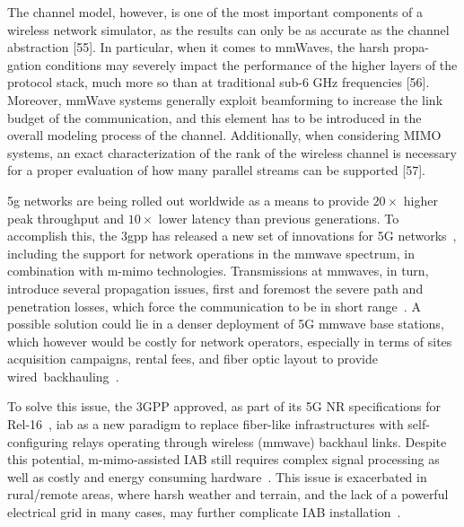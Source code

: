 The channel model, however, is one of the most important components of a
wireless network simulator, as the results can only be as accurate as the channel
abstraction [55]. In particular, when it comes to mmWaves, the harsh propa-
gation conditions may severely impact the performance of the higher layers of
the protocol stack, much more so than at traditional sub-6 GHz frequencies [56].
Moreover, mmWave systems generally exploit beamforming to increase the link
budget of the communication, and this element has to be introduced in the overall
modeling process of the channel. Additionally, when considering MIMO systems,
an exact characterization of the rank of the wireless channel is necessary for a
proper evaluation of how many parallel streams can be supported [57].



\Gls{5g} networks are being rolled out worldwide 
as a means to provide $20\times$ higher peak throughput and $10\times$ lower latency than previous generations.
To accomplish this, the \gls{3gpp} has released a new set of innovations for 5G networks~\cite{38300}, including the support for network operations in the \gls{mmwave} spectrum, in combination with \gls{m-mimo} technologies.
Transmissions at \glspl{mmwave}, in turn, introduce several propagation issues, first and foremost the severe path and penetration losses, which force the communication to be in short range~\cite{rangan2017potentials}.
A possible solution could lie in a denser deployment of 5G \gls{mmwave} base stations, which however would be costly for network operators, especially in terms of sites acquisition campaigns, rental fees, and fiber optic layout to provide wired~backhauling~\cite{lopez2015towards}. 


To solve this issue, the 3GPP approved, as part of its 5G NR specifications for Rel-16~\cite{38874}, \gls{iab} as a new paradigm to replace fiber-like infrastructures with self-configuring relays operating through wireless (\gls{mmwave}) backhaul links.
Despite this potential, \mbox{\gls{m-mimo}-assisted} IAB still requires complex signal processing as well as costly and energy consuming hardware~\cite{polese2020integrated}.
This issue is exacerbated in rural/remote areas, where harsh weather and terrain, and the lack of a powerful electrical grid in many cases, may further complicate IAB installation~\cite{chaoub20216g}.

